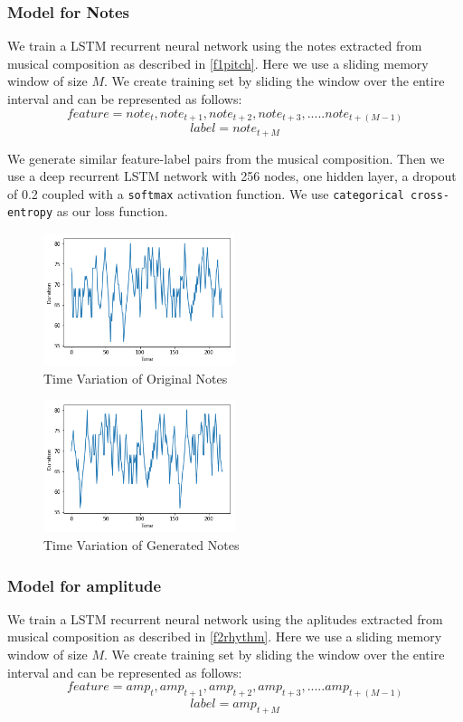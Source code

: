 \documentclass[conference]{IEEEtran}
\begin{document}
\subsubsection{Model for Notes}
We train a LSTM recurrent neural network using the notes extracted from musical composition as described in \ref{f1pitch}. Here we use a sliding memory window of size $M$. We create training set by sliding the window over the entire interval and can be represented as follows:
$$feature = {note_{t},note_{t+1},note_{t+2},note_{t+3},.....note_{t+(M-1)}}$$
$$label = {note_{t+M}}$$

We generate similar feature-label pairs from the musical composition. Then we use a deep recurrent LSTM network with 256 nodes, one hidden layer, a dropout of 0.2 coupled with a \texttt{softmax} activation function. We use \texttt{categorical cross-entropy} as our loss function.\\

\begin{figure}[h]
\includegraphics[width=0.5\textwidth]{IEEEtran/notes_o.png}
\caption{Time Variation of Original Notes}
\label{fig:figure1}
\end{figure}

\begin{figure}[h]
\includegraphics[width=0.5\textwidth]{IEEEtran/notes_g.png}
\caption{Time Variation of Generated Notes}
\label{fig:figure2}
\end{figure}

\subsubsection{Model for amplitude}
We train a LSTM recurrent neural network using the aplitudes extracted from musical composition as described in \ref{f2rhythm}. Here we use a sliding memory window of size $M$. We create training set by sliding the window over the entire interval and can be represented as follows:
$$feature = {amp_{t},amp_{t+1},amp_{t+2},amp_{t+3},.....amp_{t+(M-1)}}$$
$$label = {amp_{t+M}}$$
\end{document}

